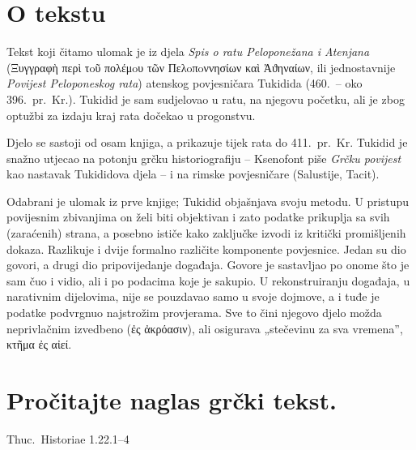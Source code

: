 
\section*{O tekstu}

Tekst koji čitamo ulomak je iz djela \textit{Spis o ratu Peloponežana i Atenjana} \textgreek[variant=ancient]{(Ξυγγραφὴ περὶ τoῦ πολέμoυ τῶν Пελoπoννησίων καὶ Ἀϑηναίων,} ili jednostavnije \textit{Povijest Peloponeskog rata}) atenskog povjesničara Tukidida (460.\ – oko 396.\ pr.~Kr.). Tukidid je sam sudjelovao u ratu, na njegovu početku, ali je zbog optužbi za izdaju kraj rata dočekao u progonstvu. 

Djelo se sastoji od osam knjiga, a prikazuje tijek rata do 411.\ pr.~Kr. Tukidid je snažno utjecao na potonju grčku historiografiju – Ksenofont piše \textit{Grčku povijest} kao nastavak Tukididova djela – i na rimske povjesničare (Salustije, Tacit).

Odabrani je ulomak iz prve knjige; Tukidid objašnjava svoju metodu. U pristupu povijesnim zbivanjima on želi biti objektivan i zato podatke prikuplja sa svih (zaraćenih) strana, a posebno ističe kako zaključke izvodi iz kritički promišljenih dokaza. Razlikuje i dvije formalno različite komponente povjesnice. Jedan su dio govori, a drugi dio pripovijedanje događaja. Govore je sastavljao po onome što je sam čuo i vidio, ali i po podacima koje je sakupio. U rekonstruiranju događaja, u narativnim dijelovima, nije se pouzdavao samo u svoje dojmove, a i tuđe je podatke podvrgnuo najstrožim provjerama. Sve to čini njegovo djelo možda neprivlačnim izvedbeno \textgreek[variant=ancient]{(ἐς ἀκρόασιν)}, ali osigurava „stečevinu za sva vremena”, \textgreek[variant=ancient]{κτῆμα ἐς αἰεί.}

\newpage

\section*{Pročitajte naglas grčki tekst.}

Thuc.\ Historiae 1.22.1–4


\medskip


